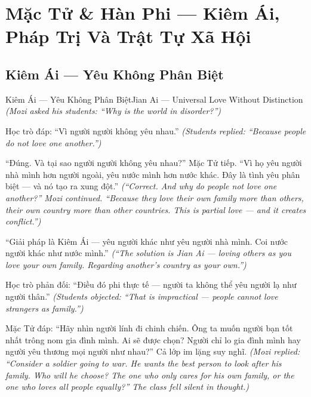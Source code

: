\chapter{Mặc Tử \& Hàn Phi — Kiêm Ái, Pháp Trị Và Trật Tự Xã Hội}

\section{Kiêm Ái — Yêu Không Phân Biệt}
\begin{truyen}{Kiêm Ái — Yêu Không Phân Biệt}{Jian Ai — Universal Love Without Distinction}
\textit{(Mozi asked his students: ``Why is the world in disorder?'')}

Học trò đáp: ``Vì người người không yêu nhau.''
\textit{(Students replied: ``Because people do not love one another.'')}

``Đúng. Và tại sao người người không yêu nhau?'' Mặc Tử tiếp. ``Vì họ yêu người nhà mình hơn người ngoài, yêu nước mình hơn nước khác. Đây là tình yêu phân biệt — và nó tạo ra xung đột.''
\textit{(``Correct. And why do people not love one another?'' Mozi continued. ``Because they love their own family more than others, their own country more than other countries. This is partial love — and it creates conflict.'')}

``Giải pháp là Kiêm Ái — yêu người khác như yêu người nhà mình. Coi nước người khác như nước mình.''
\textit{(``The solution is Jian Ai — loving others as you love your own family. Regarding another's country as your own.'')}

Học trò phản đối: ``Điều đó phi thực tế — người ta không thể yêu người lạ như người thân.''
\textit{(Students objected: ``That is impractical — people cannot love strangers as family.'')}

Mặc Tử đáp: ``Hãy nhìn người lính đi chinh chiến. Ông ta muốn người bạn tốt nhất trông nom gia đình mình. Ai sẽ được chọn? Người chỉ lo gia đình mình hay người yêu thương mọi người như nhau?'' Cả lớp im lặng suy nghĩ.
\textit{(Mozi replied: ``Consider a soldier going to war. He wants the best person to look after his family. Who will he choose? The one who only cares for his own family, or the one who loves all people equally?'' The class fell silent in thought.)}

\end{truyen}

